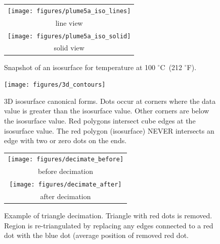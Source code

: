 \documentclass[11pt,twoside]{book}
\newcommand{\degF}{$^\circ$F}
\newcommand{\degC}{$^\circ$C}
\newcommand{\figoptions}{htp}
\begin{document}
\begin{figure}[\figoptions]
\begin{center}
\begin{tabular}{c}
\texttt{[image: figures/plume5a\_iso\_lines]}\\
line view\\
\texttt{[image: figures/plume5a\_iso\_solid]}\\
solid view
\end{tabular}
\end{center}
\caption{Snapshot of an isosurface for temperature at 100 \degC\ (212 \degF).
  }
\label{figiso}%
\end{figure}

\begin{figure}[\figoptions]
\begin{center}
\texttt{[image: figures/3d\_contours]}
\end{center}
\caption[3D isosurface canonical forms.]{3D isosurface canonical forms.
Dots occur at corners where the data value is greater than the isosurface value.  Other corners are below the isosurface value.  Red polygons intersect cube edges at the isosurface value.  The red polygon (isosurface) NEVER intersects an edge with two or zero dots on the ends.
  }
\label{figisosetup}%
\end{figure}


\begin{figure}[\figoptions]
\begin{center}
\begin{tabular}{c}
\texttt{[image: figures/decimate\_before]}\\
before decimation\\
\texttt{[image: figures/decimate\_after]}\\
after decimation
\end{tabular}
\end{center}
\caption[Example of triangle decimation.]{Example of triangle decimation.  Triangle with red dots is removed.  Region is re-triangulated by replacing any edges connected to a red dot with the blue dot (average position of removed red dot.}
\label{figdecimate}%
\end{figure}
\end{document}
